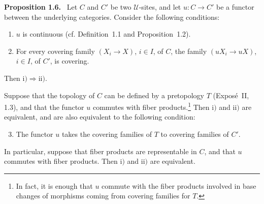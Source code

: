 \documentclass[11pt]{article}
\newcommand{\U}{\mathcal{U}}
\newenvironment{statement}[1]{\par\medskip\noindent\textbf{#1.}\ }{\par\medskip}
\begin{document}
\begin{statement}{Proposition 1.6}
Let \(C\) and \(C'\) be two \(\U\)-sites, and let \(u:C\to C'\) be a functor between the underlying categories. Consider the following conditions:
\begin{enumerate}[label=\roman*)]
\item \(u\) is continuous (cf. Definition~1.1 and Proposition~1.2).

\item For every covering family \((X_i\to X)\), \(i\in I\), of \(C\), the family \((uX_i\to uX)\), \(i\in I\), of \(C'\), is covering.
\end{enumerate}
Then \(\mathrm{i)}\Rightarrow\mathrm{ii)}\).

Suppose that the topology of \(C\) can be defined by a pretopology \(T\) (Expos\'e~II, 1.3), and that the functor \(u\) commutes with fiber products.\footnote{In fact, it is enough that \(u\) commute with the fiber products involved in base changes of morphisms coming from covering families for \(T\).} Then \(\mathrm{i)}\) and \(\mathrm{ii)}\) are equivalent, and are also equivalent to the following condition:
\begin{enumerate}[label=\roman*)]
\setcounter{enumi}{2}
\item The functor \(u\) takes the covering families of \(T\) to covering families of \(C'\).
\end{enumerate}
In particular, suppose that fiber products are representable in \(C\), and that \(u\) commutes with fiber products. Then \(\mathrm{i)}\) and \(\mathrm{ii)}\) are equivalent.
\end{statement}
\end{document}
